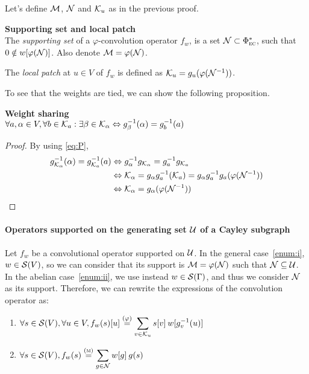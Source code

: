 Let's define $\cm$, $\cn$ and $\ck_u$ as in the previous proof.
\begin{definition}\textbf{Supporting set and local patch}\\
The \emph{supporting set} of a $\varphi$-convolution operator $f_w$, is a set $\cn \subset \Phi^*_{\EC}$, such that $0 \notin w[\varphi(\cn)]$. Also denote $\cm = \varphi(\cn)$.

The \emph{local patch} at $u \in V$ of $f_w$ is defined as $\ck_u = g_u(\varphi(\cn^{-1}))$.
\end{definition}

To see that the weights are tied, we can show the following proposition.

\begin{proposition}\textbf{Weight sharing}\\
$\forall a, \alpha \in V, \forall b \in \ck_a: \exists \beta \in \ck_{\alpha} \Leftrightarrow g_{\beta}^{-1}(\alpha) = g_{b}^{-1}(a)$
\end{proposition}
\begin{proof}
By using \eqref{eq:P},
\begin{align*}
g_{\ck_\alpha}^{-1}(\alpha) = g_{\ck_a}^{-1}(a)
	& \Leftrightarrow  g_{\alpha}^{-1}g_{\ck_{\alpha}} = g_a^{-1}g_{\ck_a}\\
	& \Leftrightarrow  \ck_{\alpha} = g_{\alpha}g_a^{-1}(\ck_a) = g_{\alpha}g_a^{-1}g_a(\varphi(\cn^{-1}))\\
	& \Leftrightarrow  \ck_{\alpha} = g_{\alpha}(\varphi(\cn^{-1}))
\end{align*}
\end{proof}

\paragraph{Operators supported on the generating set $\cu$ of a Cayley subgraph}
Let $f_w$ be a convolutional operator supported on $\cu$. In the general case~\ref{enum:i}, $w \in \cs(V)$, so we can consider that its support is $\cm = \varphi(\cn)$ such that $\cn \subseteq \cu$. In the abelian case~\ref{enum:ii}, we use instead $w \in \cs(\Gamma)$, and thus we consider $\cn$ as its support.
Therefore, we can rewrite the expressions of the convolution operator as:
\begin{enumerate}[label=(\roman*)]
  \item $\forall s \in \cs(V), \forall u \in V, f_w(s)[u]
          \overset{(\varphi)}= \displaystyle\sum_{v \in \ck_u} s[v] \h{2} w[g_v^{-1}(u)]$ \label{enum:i}
  \item $\forall s \in \cs(V), f_w(s) \overset{(\M)}= \displaystyle\sum_{g \in \cn} w[g] \h{2} g(s)$ \label{enum:ii}
\end{enumerate}

